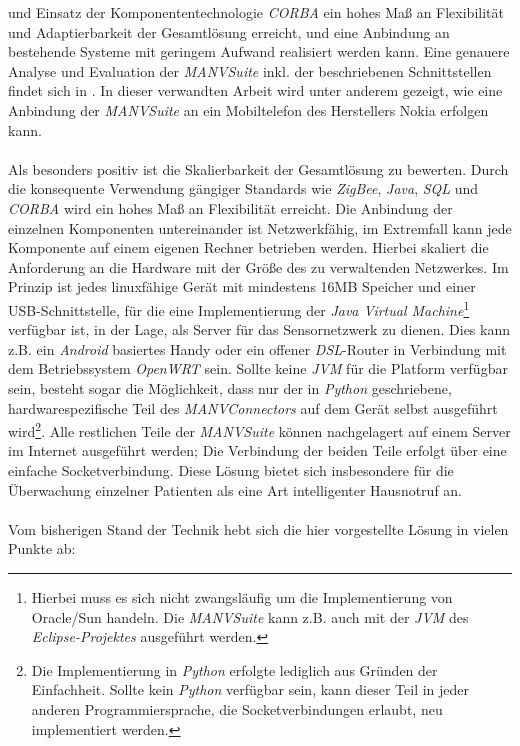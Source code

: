 und Einsatz der Komponententechnologie \emph{CORBA} ein hohes Maß an Flexibilität und Adaptierbarkeit der
Gesamtlösung erreicht, und eine Anbindung an bestehende Systeme mit geringem Aufwand realisiert werden kann.
Eine genauere Analyse und Evaluation der \emph{MANVSuite} inkl. der beschriebenen Schnittstellen findet sich
in \cite{Jan}. In dieser verwandten Arbeit wird unter anderem gezeigt, wie eine Anbindung der \emph{MANVSuite}
an ein Mobiltelefon des Herstellers Nokia erfolgen kann.\\
\\
Als besonders positiv ist die Skalierbarkeit der Gesamtlösung zu bewerten. Durch die konsequente Verwendung
gängiger Standards wie \emph{ZigBee}, \emph{Java}, \emph{SQL} und \emph{CORBA} wird ein hohes Maß an Flexibilität
erreicht. Die Anbindung der einzelnen Komponenten untereinander ist Netzwerkfähig, im Extremfall kann jede
Komponente auf einem eigenen Rechner betrieben werden. Hierbei skaliert die Anforderung an die Hardware mit
der Größe des zu verwaltenden Netzwerkes. Im Prinzip ist jedes linuxfähige Gerät mit mindestens 16MB Speicher
und einer USB-Schnittstelle, für die eine Implementierung der \emph{Java Virtual Machine}\footnote{Hierbei muss
es sich nicht zwangsläufig um die Implementierung von Oracle/Sun handeln. Die \emph{MANVSuite} kann z.B. auch
mit der \emph{JVM} des \emph{Eclipse-Projektes} ausgeführt werden.} verfügbar ist, in der Lage, als Server
für das Sensornetzwerk zu dienen. Dies kann z.B. ein \emph{Android} basiertes Handy oder ein offener
\emph{DSL}-Router in Verbindung mit dem Betriebssystem \emph{OpenWRT} sein. Sollte keine \emph{JVM} für die
Platform verfügbar sein, besteht sogar die Möglichkeit, dass nur der in \emph{Python} geschriebene,
hardwarespezifische Teil des \emph{MANVConnectors} auf dem Gerät selbst ausgeführt wird\footnote{Die Implementierung
in \emph{Python} erfolgte lediglich aus Gründen der Einfachheit. Sollte kein \emph{Python} verfügbar sein,
kann dieser Teil in jeder anderen Programmiersprache, die Socketverbindungen erlaubt, neu implementiert werden.}. 
Alle restlichen Teile der \emph{MANVSuite} können nachgelagert auf einem Server im Internet ausgeführt werden; 
Die Verbindung der beiden Teile erfolgt über eine einfache Socketverbindung. Diese Lösung bietet sich insbesondere 
für die Überwachung einzelner Patienten als eine Art intelligenter Hausnotruf an.\\
\\
Vom bisherigen Stand der Technik hebt sich die hier vorgestellte Lösung in vielen Punkte ab:


